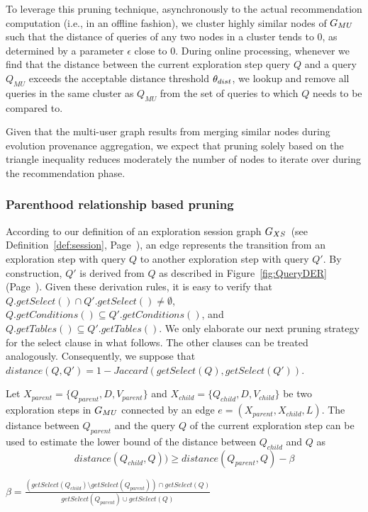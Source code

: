 To leverage this pruning technique, asynchronously to the actual recommendation computation (i.e., in an offline fashion), we cluster highly similar nodes of $G_{MU}{}$ such that the distance of queries of any two nodes in a cluster tends to 0, as determined by a parameter $\epsilon$ close to 0. During online processing, whenever we find that the distance between the current exploration step query $Q$ and a query $Q_{MU}$ exceeds the acceptable distance threshold $\theta_{dist}$, we lookup and remove all queries in the same cluster as $Q_{MU}$ from the set of queries to which $Q$ needs to be compared to. 

Given that the multi-user graph results from merging similar nodes during evolution provenance aggregation, we expect that pruning solely based on the triangle inequality reduces moderately the number of nodes to iterate over during the recommendation phase. 


\subsubsection {Parenthood relationship based pruning}
\label{subsec:child-parent}

According to our definition of an exploration session graph $G_{XS}$~(see Definition~\ref{def:session}, Page~\pageref{def:session}), an edge represents the transition from an exploration step with query $Q$ to another exploration step with query $Q'$. By construction, $Q'$ is derived from $Q$ as described in %
Figure~\ref{fig:QueryDER} (Page~\pageref{fig:QueryDER}). 
Given these derivation rules, it is easy to verify that  $Q.getSelect() \cap Q'.getSelect() \neq \emptyset$, $Q.getConditions() \subseteq Q'.getConditions()$, and $ Q.getTables() \subseteq Q'.getTables()$.
We only elaborate our next pruning strategy for the select clause in what follows. The other clauses can be treated analogously. Consequently, we suppose that $distance(Q,Q')=1- Jaccard(getSelect(Q),getSelect(Q'))$.

\begin{lemma}
\label{def1}
Let {$X_{parent}=\{Q_{parent},D,V_{parent}\}$} and {$X_{child}=\{Q_{child},D,V_{child}\}$} be two exploration steps in $G_{MU}$ connected by an edge $e = (X_{parent}, X_{child}, L)$. 
The distance between $Q_{parent}$ and  the query $Q$ of the current exploration step can be used to estimate the lower bound of the distance between $Q_{child}$ and $Q$ as
\begin{equation}
distance(Q_{child},Q) ) \geq
	distance(Q_{parent},Q) - \beta  \label{eq:parentPrune}
\end{equation}


	$ \beta= \frac{ \left( getSelect(Q_{child}) \setminus getSelect(Q_{parent}) \right) \cap getSelect(Q)  } {getSelect(Q_{parent}) \cup getSelect(Q)}$
\end{lemma}

